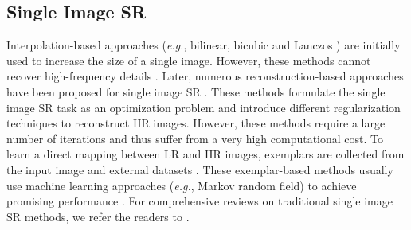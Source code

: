 \documentclass[journal]{IEEEtran}
\begin{document}
	\subsection{Single Image SR}
	Interpolation-based approaches (\emph{e.g.}, bilinear, bicubic and Lanczos \cite{1990-FiltersforCommonResamplingTasks-Turkowski-147-165}) are initially used to increase the size of a single image. However, these methods cannot recover high-frequency details \cite{2003-SuperResolutionImageReconstruction:aTechnicalOverview-Park-21-36}. Later, numerous reconstruction-based approaches have been proposed for single image SR \cite{2005-ImageupSamplingUsingTotalVariationRegularizationwithaNewObservationModel-Aly-1647-1659,2007-ImageUpsamplingViaImposedEdgeStatistics-Fattal-95-95,2008-ImageSuperResolutionUsingGradientProfilePrior-Sun--}. These methods formulate the single image SR task as an optimization problem and introduce different regularization techniques to reconstruct HR images. However, these methods require a large number of iterations and thus suffer from a very high computational cost. To learn a direct mapping between LR and HR images, exemplars are collected from the input image \cite{2009-SuperResolutionfromaSingleImage-Glasner-349-356,2011-ImageandVideoUpscalingfromLocalSelfExamples-Freedman-1-11} and external datasets \cite{2012-CoupledDictionaryTrainingforImageSuperResolution-Yang-3467-3478,2013-AnchoredNeighborhoodRegressionforFastExampleBasedSuperResolution-Timofte-1920-1927}. These exemplar-based methods usually use machine learning approaches (\emph{e.g.}, Markov random field) to achieve promising performance \cite{2014-SingleImageSuperResolution:aBenchmark-Yang-372-386}. For comprehensive reviews on traditional single image SR methods, we refer the readers to \cite{2003-SuperResolutionImageReconstruction:aTechnicalOverview-Park-21-36,2014-SingleImageSuperResolution:aBenchmark-Yang-372-386}.
	
\end{document}
